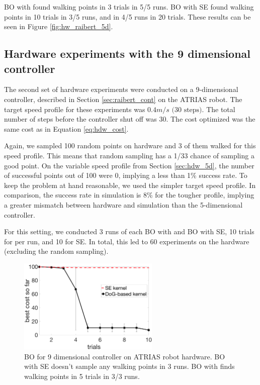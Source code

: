 BO with \dogkernel found walking points in 3 trials in 5/5 runs. BO with SE found walking points in 10 trials in 3/5 runs, and in 4/5 runs in 20 trials. These results can be seen in Figure \ref{fig:hw_raibert_5d}.


\subsection{Hardware experiments with the 9 dimensional controller}
The second set of hardware experiments were conducted on a 9-dimensional controller, described in Section \ref{sec:raibert_cont} on the ATRIAS robot. The target speed profile for these experiments was $0.4 m/s \text{ (30 steps)}$. The total number of steps before the controller shut off was $30$. The cost optimized was the same cost as in Equation \ref{eq:hdw_cost}. 

Again, we sampled 100 random points on hardware and 3 of them walked for this speed profile. This means that random sampling has a 1/33 chance of sampling a good point. On the variable speed profile from Section \ref{sec:hdw_5d}, the number of successful points out of 100 were 0, implying a less than 1\% success rate. To keep the problem at hand reasonable, we used the simpler target speed profile. In comparison, the success rate in simulation is 8\% for the tougher profile, implying a greater mismatch between hardware and simulation than the 5-dimensional controller. 

For this setting, we conducted 3 runs of each BO with \dogkernel and BO with SE, 10 trials for \dogkernel per run, and 10 for SE. In total, this led to 60 experiments on the hardware (excluding the random sampling). 

\begin{figure}[t]
\centering
\includegraphics[width=0.6\textwidth]{img/hw_raibert_9d.png}
\caption{\small{BO for 9 dimensional controller on ATRIAS robot hardware. BO with SE doesn't sample any walking points in 3 runs. BO with \dogkernel finds walking points in 5 trials in 3/3 runs.}}
\label{fig:hw_raibert_9d}
\end{figure}

